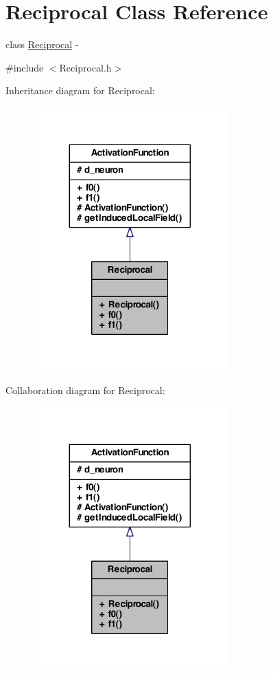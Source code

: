 \hypertarget{class_reciprocal}{
\section{Reciprocal Class Reference}
\label{class_reciprocal}
}


class \hyperlink{class_reciprocal}{Reciprocal} -\/  




{\ttfamily \#include $<$Reciprocal.h$>$}



Inheritance diagram for Reciprocal:\nopagebreak
\begin{figure}[H]
\begin{center}
\leavevmode
\includegraphics[width=212pt]{class_reciprocal__inherit__graph}
\end{center}
\end{figure}


Collaboration diagram for Reciprocal:\nopagebreak
\begin{figure}[H]
\begin{center}
\leavevmode
\includegraphics[width=212pt]{class_reciprocal__coll__graph}
\end{center}
\end{figure}
